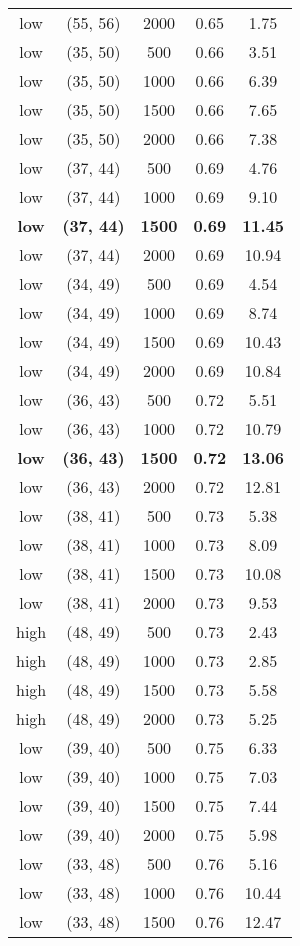 \begin{tabular}{c c c c c}
low & (55, 56) &  2000 & 0.65 & 1.75 \\
low & (35, 50) &  500 & 0.66 & 3.51 \\
low & (35, 50) &  1000 & 0.66 & 6.39 \\
low & (35, 50) &  1500 & 0.66 & 7.65 \\
low & (35, 50) &  2000 & 0.66 & 7.38 \\
low & (37, 44) &  500 & 0.69 & 4.76 \\
low & (37, 44) &  1000 & 0.69 & 9.10 \\
\textbf{low} & \textbf{(37, 44)} & \textbf{ 1500} & \textbf{0.69} & \textbf{11.45} \\
low & (37, 44) &  2000 & 0.69 & 10.94 \\
low & (34, 49) &  500 & 0.69 & 4.54 \\
low & (34, 49) &  1000 & 0.69 & 8.74 \\
low & (34, 49) &  1500 & 0.69 & 10.43 \\
low & (34, 49) &  2000 & 0.69 & 10.84 \\
low & (36, 43) &  500 & 0.72 & 5.51 \\
low & (36, 43) &  1000 & 0.72 & 10.79 \\
\textbf{low} & \textbf{(36, 43)} & \textbf{ 1500} & \textbf{0.72} & \textbf{13.06} \\
low & (36, 43) &  2000 & 0.72 & 12.81 \\
low & (38, 41) &  500 & 0.73 & 5.38 \\
low & (38, 41) &  1000 & 0.73 & 8.09 \\
low & (38, 41) &  1500 & 0.73 & 10.08 \\
low & (38, 41) &  2000 & 0.73 & 9.53 \\
high & (48, 49) &  500 & 0.73 & 2.43 \\
high & (48, 49) &  1000 & 0.73 & 2.85 \\
high & (48, 49) &  1500 & 0.73 & 5.58 \\
high & (48, 49) &  2000 & 0.73 & 5.25 \\
low & (39, 40) &  500 & 0.75 & 6.33 \\
low & (39, 40) &  1000 & 0.75 & 7.03 \\
low & (39, 40) &  1500 & 0.75 & 7.44 \\
low & (39, 40) &  2000 & 0.75 & 5.98 \\
low & (33, 48) &  500 & 0.76 & 5.16 \\
low & (33, 48) &  1000 & 0.76 & 10.44 \\
low & (33, 48) &  1500 & 0.76 & 12.47 \\

\end{tabular}
